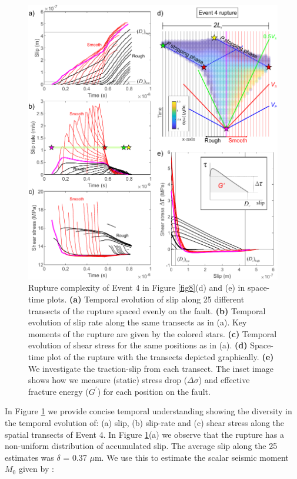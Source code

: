 \documentclass[preprint,1p, 10pt,authoryear]{elsarticle}
\begin{document}
\begin{figure}
	\centering
	\includegraphics{FIG9.pdf} 
	\caption{Rupture complexity of Event 4 in Figure \ref{fig8}(d) and (e) in space-time plots.  \textbf{(a)} Temporal evolution of slip along 25 different transects of the rupture spaced evenly on the fault. \textbf{(b)} Temporal evolution of slip rate along the same transects as in (a). Key moments of the rupture are given by the colored stars. \textbf{(c)} Temporal evolution of shear stress for the same positions as in (a). \textbf{(d)} Space-time plot of the rupture with the transects depicted graphically. \textbf{(e)} We investigate the traction-slip from each transect. The inset image shows how we measure (static) stress drop ($\Delta \sigma$) and effective fracture energy ($G^{'}$) for each position on the fault.}
	\label{fig9}
	
\end{figure}
In Figure \ref{fig9} we provide concise temporal understanding showing the diversity in the temporal evolution of: (a) slip, (b) slip-rate and (c) shear stress along the spatial transects of Event 4. In Figure \ref{fig9}(a) we observe that the rupture has a non-uniform distribution of accumulated slip. The average slip along the 25 estimates was $\delta$ = 0.37 $\mu$m.  We use this to estimate the scalar seismic moment $M_{0}$ given by \citet{Aki1966}: 
\end{document}
